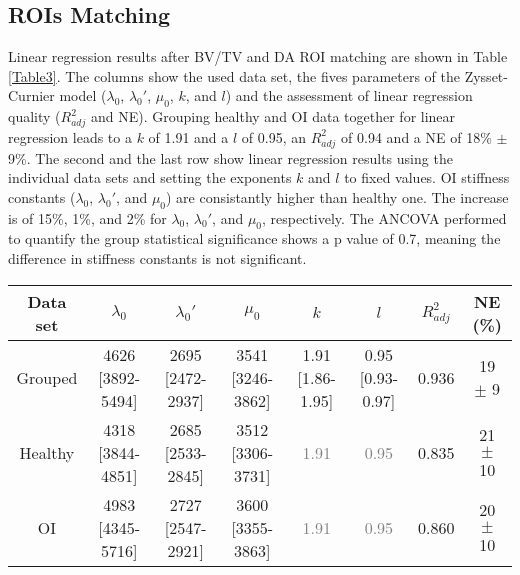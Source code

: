\documentclass[a4paper,fleqn]{DC_ArtStyle}
\begin{document}
\subsection{ROIs Matching}
Linear regression results after BV/TV and DA ROI matching are shown in Table \ref{Table3}. The columns show the used data set, the fives parameters of the Zysset-Curnier model ($\lambda_0$, $\lambda_0'$, $\mu_0$, $k$, and $l$) and the assessment of linear regression quality ($R^2_{adj}$ and NE). Grouping healthy and OI data together for linear regression leads to a $k$ of 1.91 and a $l$ of 0.95, an $R^2_{adj}$ of 0.94 and a NE of 18\% $\pm$ 9\%. The second and the last row show linear regression results using the individual data sets and setting the exponents $k$ and $l$ to fixed values. OI stiffness constants ($\lambda_0$, $\lambda_0'$, and $\mu_0$) are consistantly higher than healthy one. The increase is of 15\%, 1\%, and 2\% for $\lambda_0$, $\lambda_0'$, and $\mu_0$, respectively. The ANCOVA performed to quantify the group statistical significance shows a p value of 0.7, meaning the difference in stiffness constants is not significant.\\

\begin{table*}[b]
	\caption{Constants obtained with BV/TV and DA matched data sets. Comparison is performed between grouped (N ROIs = 166) and separated data sets (N ROIs = 83). Values are presented as value [95\% CI] or mean $\pm$ standard deviation. Values in gray were fixed in the linear regression.}
	\label{Table3}
	\begin{tabular}{cccccccc}
		\toprule
		Data set & $\lambda_0$ & $\lambda_0'$ & $\mu_0$ & $k$ & $l$ & $R^2_{adj}$ & NE (\%) \\
		\midrule
		Grouped & 4626 [3892-5494] & 2695 [2472-2937] & 3541 [3246-3862] & 1.91 [1.86-1.95] & 0.95 [0.93-0.97] & 0.936 & 19 $\pm$ 9\\
		
		Healthy & 4318 [3844-4851] & 2685 [2533-2845] & 3512 [3306-3731] & \textcolor{gray}{1.91} & \textcolor{gray}{0.95} & 0.835 & 21 $\pm$ 10\\
		
		OI & 4983 [4345-5716] & 2727 [2547-2921] & 3600 [3355-3863] & \textcolor{gray}{1.91} & \textcolor{gray}{0.95} & 0.860 & 20 $\pm$ 10\\
		\bottomrule
	\end{tabular}
\end{table*}
\end{document}
